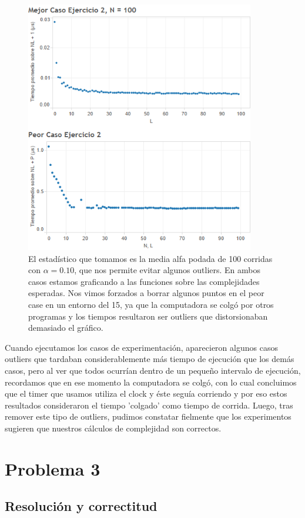 \documentclass{article}
\theoremstyle{definition}
\theoremstyle{remark}
\begin{document}
\begin{figure}
\centering
\includegraphics[width=10cm]{ex2}
\caption{El estadístico que tomamos es la media alfa podada de 100 corridas con $\alpha = 0.10$, que nos permite evitar algunos outliers. En ambos casos estamos graficando a las funciones sobre las complejidades esperadas. Nos vimos forzados a borrar algunos puntos en el peor case en un entorno del 15, ya que la computadora se colgó por otros programas y los tiempos resultaron ser outliers que distorsionaban demasiado el gráfico.\label{grf:ex2}}
\end{figure}

Cuando ejecutamos los casos de experimentación, aparecieron algunos casos outliers que tardaban considerablemente más tiempo de ejecución que los demás casos, pero al ver que todos ocurrían dentro de un pequeño intervalo de ejecución, recordamos que en ese momento la computadora se colgó, con lo cual concluimos que el timer que usamos utiliza el clock y éste seguía corriendo y por eso estos resultados consideraron el tiempo 'colgado' como tiempo de corrida. Luego, tras remover este tipo de outliers, pudimos constatar fielmente que los experimentos sugieren que nuestros cálculos de complejidad son correctos.

\pagebreak

\section{Problema 3}

\subsection{Resolución y correctitud}
\end{document}
